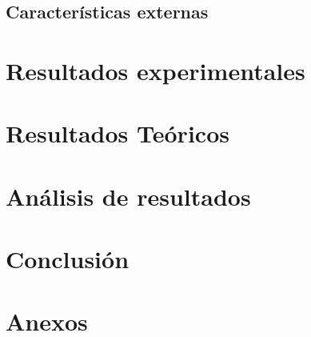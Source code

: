 \documentclass[11pt,letterpaper]{article}     %
\begin{document}
\subsection{Características externas}

\section{Resultados experimentales}

\section{Resultados Teóricos}

\section{Análisis de resultados}
\section{Conclusión}
\newpage
\section{Anexos}
\end{document}
